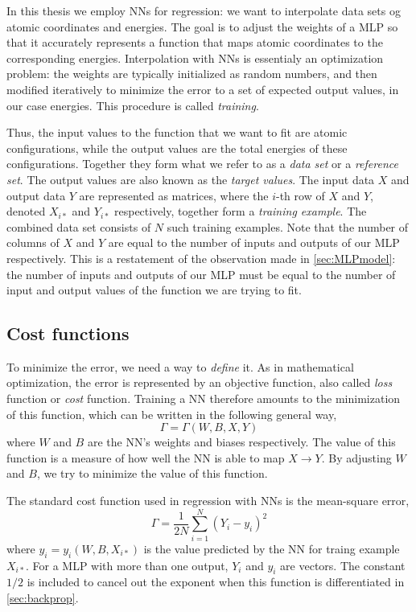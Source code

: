 \documentclass[twoside,english]{uiofysmaster}
\begin{document}
In this thesis we employ NNs for regression: we want to interpolate data sets og atomic coordinates and energies.
The goal is to adjust the weights of a MLP so that it accurately represents a function that maps
atomic coordinates to the corresponding energies. Interpolation with NNs is essentialy an optimization problem:
the weights are typically initialized as random numbers, and then modified iteratively to minimize the error
to a set of expected output values, in our case energies. 
This procedure is called \textit{training}. 

Thus, the input values to the function that we want to fit are atomic configurations,
while the output values are the total energies of these configurations. 
Together they form what we refer to as a \textit{data set} or a \textit{reference set}. 
The output values are also known as the \textit{target values}. 
The input data $X$ and output data $Y$ are represented as matrices, where the $i$-th row of $X$ and $Y$, 
denoted $X_{i*}$ and $Y_{i*}$ respectively, 
together form a \textit{training example}. The combined data set consists of $N$ such training examples. 
Note that the number of columns of $X$ and $Y$ are equal to the number of inputs and outputs of our MLP respectively. 
This is a restatement of the observation made in \autoref{sec:MLPmodel}: the number of inputs and outputs of our MLP must be equal 
to the number of input and output values of the function we are trying to fit. 


\subsection{Cost functions} \label{costFunctions}
To minimize the error, we need a way to \textit{define} it. 
As in mathematical optimization, the error is represented by an objective function, also called \textit{loss} function
or \textit{cost} function. Training a NN therefore amounts to the minimization of this function, which can be written in the 
following general way,
\begin{equation}
 \Gamma = \Gamma(W, B, X, Y)
 \label{generalCost}
\end{equation}
where $W$ and $B$ are the NN's weights and biases respectively. 
The value of this function is a measure of how well the NN is able to map $X \rightarrow Y$. 
By adjusting $W$ and $B$, we try to minimize the value of this function.  

The standard cost function used in regression with NNs is the mean-square error,
\begin{equation}
 \Gamma = \frac{1}{2N}\sum_{i=1}^N (Y_i - y_i)^2
 \label{quadraticCost}
\end{equation}
where $y_i = y_i(W, B, X_{i*})$ is the value predicted by the NN for traing example $X_{i*}$. 
For a MLP with more than one output, $Y_i$ and $y_i$ are vectors. 
The constant $1/2$ is included to cancel out the exponent when this function is differentiated in \autoref{sec:backprop}.
\end{document}
